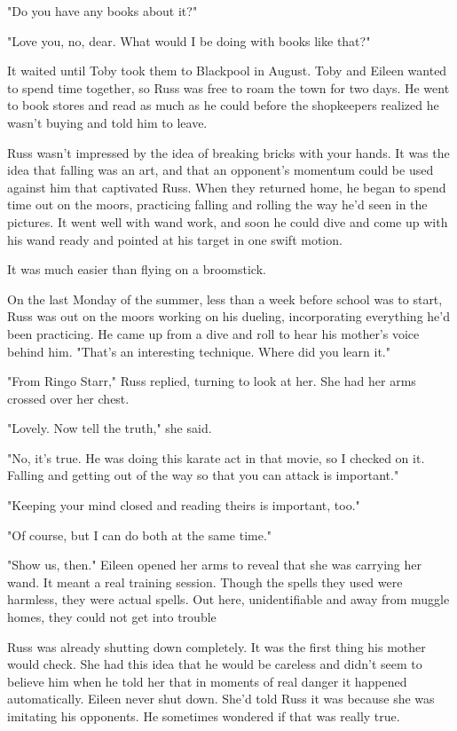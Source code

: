 \documentclass[a4paper,11pt]{article}
\begin{document}
"Do you have any books about it?"

"Love you, no, dear. What would I be doing with books like that?"

It waited until Toby took them to Blackpool in August. Toby and Eileen wanted to spend time together, so Russ was free to roam the town for two days. He went to book stores and read as much as he could before the shopkeepers realized he wasn't buying and told him to leave.

Russ wasn't impressed by the idea of breaking bricks with your hands. It was the idea that falling was an art, and that an opponent's momentum could be used against him that captivated Russ. When they returned home, he began to spend time out on the moors, practicing falling and rolling the way he'd seen in the pictures. It went well with wand work, and soon he could dive and come up with his wand ready and pointed at his target in one swift motion.

It was much easier than flying on a broomstick.

On the last Monday of the summer, less than a week before school was to start, Russ was out on the moors working on his dueling, incorporating everything he'd been practicing. He came up from a dive and roll to hear his mother's voice behind him. "That's an interesting technique. Where did you learn it."

"From Ringo Starr," Russ replied, turning to look at her. She had her arms crossed over her chest.

"Lovely. Now tell the truth," she said.

"No, it's true. He was doing this karate act in that movie, so I checked on it. Falling and getting out of the way so that you can attack is important."

"Keeping your mind closed and reading theirs is important, too."

"Of course, but I can do both at the same time."

"Show us, then." Eileen opened her arms to reveal that she was carrying her wand. It meant a real training session. Though the spells they used were harmless, they were actual spells. Out here, unidentifiable and away from muggle homes, they could not get into trouble

Russ was already shutting down completely. It was the first thing his mother would check. She had this idea that he would be careless and didn't seem to believe him when he told her that in moments of real danger it happened automatically. Eileen never shut down. She'd told Russ it was because she was imitating his opponents. He sometimes wondered if that was really true.
\end{document}

